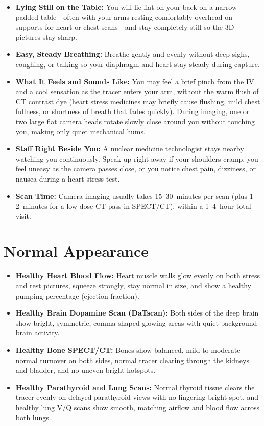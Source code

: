 \begin{itemize}
    \item \textbf{Lying Still on the Table:} You will lie flat on your back on a narrow padded table---often with your arms resting comfortably overhead on supports for heart or chest scans---and stay completely still so the 3D pictures stay sharp.
    \item \textbf{Easy, Steady Breathing:} Breathe gently and evenly without deep sighs, coughing, or talking so your diaphragm and heart stay steady during capture.
    \item \textbf{What It Feels and Sounds Like:} You may feel a brief pinch from the IV and a cool sensation as the tracer enters your arm, without the warm flush of CT contrast dye (heart stress medicines may briefly cause flushing, mild chest fullness, or shortness of breath that fades quickly). During imaging, one or two large flat camera heads rotate slowly close around you without touching you, making only quiet mechanical hums.
    \item \textbf{Staff Right Beside You:} A nuclear medicine technologist stays nearby watching you continuously. Speak up right away if your shoulders cramp, you feel uneasy as the camera passes close, or you notice chest pain, dizziness, or nausea during a heart stress test.
    \item \textbf{Scan Time:} Camera imaging usually takes 15--30~minutes per scan (plus 1--2~minutes for a low-dose CT pass in SPECT/CT), within a 1--4~hour total visit.
\end{itemize}

\section{Normal Appearance}

\begin{itemize}
    \item \textbf{Healthy Heart Blood Flow:} Heart muscle walls glow evenly on both stress and rest pictures, squeeze strongly, stay normal in size, and show a healthy pumping percentage (ejection fraction).
    \item \textbf{Healthy Brain Dopamine Scan (DaTscan):} Both sides of the deep brain show bright, symmetric, comma-shaped glowing areas with quiet background brain activity.
    \item \textbf{Healthy Bone SPECT/CT:} Bones show balanced, mild-to-moderate normal turnover on both sides, normal tracer clearing through the kidneys and bladder, and no uneven bright hotspots.
    \item \textbf{Healthy Parathyroid and Lung Scans:} Normal thyroid tissue clears the tracer evenly on delayed parathyroid views with no lingering bright spot, and healthy lung V/Q scans show smooth, matching airflow and blood flow across both lungs.
\end{itemize}

